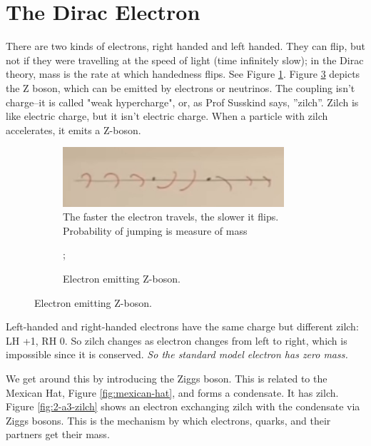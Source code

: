 \documentclass[]{article}
\begin{document}
\section{The Dirac Electron}

There are two kinds of electrons, right handed and left handed. They can flip, but not if they were travelling at the speed of light (time infinitely slow); in the Dirac theory, mass is the rate at which handedness flips. See Figure \ref{fig:2-a3-flipping-electron}. Figure \ref{fig:2-a3-Z-boson} depicts the Z boson, which can be emitted by electrons or neutrinos. The coupling isn't charge--it is called "weak hypercharge", or, as Prof Susskind says, ''zilch''. Zilch is like electric charge, but it isn't electric charge. When a particle with zilch accelerates, it emits a Z-boson.

\begin{figure}[H]
	\caption{Electron flipping between left and right}
	\begin{subfigure}[t]{0.65\textwidth}
		\caption{The faster the electron travels, the slower it flips. Probability of jumping is measure of mass}\label{fig:2-a3-flipping-electron}
		\includegraphics[width=0.9\textwidth]{2-a3-flipping-electron}
	\end{subfigure}
	\begin{subfigure}[t]{0.3\textwidth}
		\caption{Electron emitting Z-boson. }\label{fig:2-a3-Z-boson}
		;
	\end{subfigure}	
\end{figure} 


Left-handed and right-handed electrons have the same charge but different zilch: LH +1, RH 0. So zilch changes as electron changes from left to right, which is impossible since it is conserved. \emph{So the standard model electron has zero mass.}

We get around this by introducing the Ziggs boson. This is related to the Mexican Hat, Figure \ref{fig:mexican-hat}, and forms a condensate. It has zilch. Figure \ref{fig:2-a3-zilch} shows an electron exchanging zilch with the condensate via Ziggs bosons. This is the mechanism by which electrons, quarks, and their partners get their mass.
\end{document}
